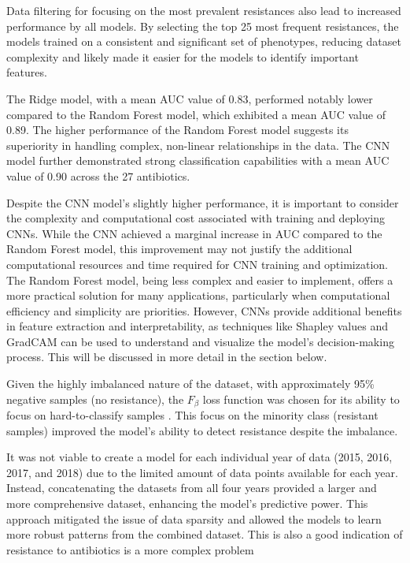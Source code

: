 \documentclass[english,11pt,a4paper,titlepage]{article}
\begin{document}
Data filtering for focusing on the most prevalent resistances also lead to increased performance by all models. By selecting the top 25 most frequent resistances, the models trained on a consistent and significant set of phenotypes, reducing dataset complexity and likely made it easier for the models to identify important features.

The Ridge model, with a mean AUC value of 0.83, performed notably lower compared to the Random Forest model, which exhibited a mean AUC value of 0.89. The higher performance of the Random Forest model suggests its superiority in handling complex, non-linear relationships in the data. The CNN model further demonstrated strong classification capabilities with a mean AUC value of 0.90 across the 27 antibiotics.

Despite the CNN model's slightly higher performance, it is important to consider the complexity and computational cost associated with training and deploying CNNs. While the CNN achieved a marginal increase in AUC compared to the Random Forest model, this improvement may not justify the additional computational resources and time required for CNN training and optimization. The Random Forest model, being less complex and easier to implement, offers a more practical solution for many applications, particularly when computational efficiency and simplicity are priorities. However, CNNs provide additional benefits in feature extraction and interpretability, as techniques like Shapley values and GradCAM can be used to understand and visualize the model's decision-making process. This will be discussed in more detail in the section below.

Given the highly imbalanced nature of the dataset, with approximately 95\% negative samples (no resistance), the \( F_\beta \) loss function was chosen for its ability to focus on hard-to-classify samples \cite{leeSurrogateLossFunction2021}. This focus on the minority class (resistant samples) improved the model's ability to detect resistance despite the imbalance. 

It was not viable to create a model for each individual year of data (2015, 2016, 2017, and 2018) due to the limited amount of data points available for each year. Instead, concatenating the datasets from all four years provided a larger and more comprehensive dataset, enhancing the model's predictive power. This approach mitigated the issue of data sparsity and allowed the models to learn more robust patterns from the combined dataset. This is also a good indication of resistance to antibiotics is a more complex problem
\end{document}
